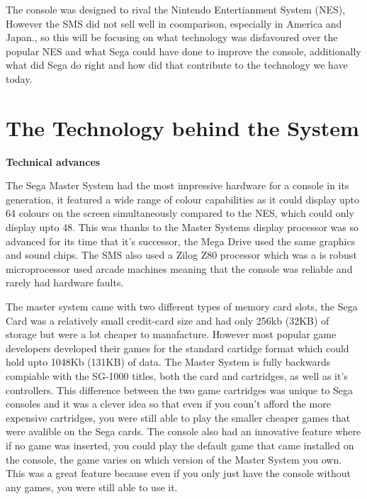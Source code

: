 \documentclass{scrartcl}
\begin{document}
The console was designed to rival the Nintendo Entertianment System (NES), However the SMS did not sell well in coomparison, especially in America and Japan.\cite{Orland}, so this will be focusing on what technology was disfavoured over the popular NES and what Sega could have done to improve the console, additionally what did Sega do right and how did that contribute to the technology we have today.

\section{The Technology behind the System}

\textbf{Technical advances} \par

The Sega Master System had the most impressive hardware for a console in its generation, it featured a wide range of colour capabilities as it could display upto 64 colours on the screen simultaneously compared to the NES\cite{racket}, which could only display upto 48. This was thanks to the Master Systems display processor was so advanced for its time that it's successor, the Mega Drive used the same graphics and sound chips. The SMS also used a Zilog Z80 processor which was a is robust microprocessor used arcade machines meaning that the console was reliable and rarely had hardware faults.\cite{russell} 

The master system came with two different types of memory card slots, the Sega Card was a relatively small credit-card size and had only 256kb (32KB) of storage but were a lot cheaper to manafacture. However most popular game developers developed their games for the standard cartidge format which could hold upto 1048Kb (131KB) of data. \cite{Weiss2009} The Master System is fully backwards compiable with the SG-1000 titles, both the card and cartridges, as well as it's controllers. \cite{racket} This difference between the two game cartridges was unique to Sega consoles and it was a clever idea so that even if you coun't afford the more expensive cartridges, you were still able to play the smaller cheaper games that were avalible on the Sega cards. The console also had an innovative feature where if no game was inserted, you could play the default game that came installed on the console, the game varies on which version of the Master System you own. This was a great feature because even if you only just have the console without any games, you were still able to use it.
\end{document}
